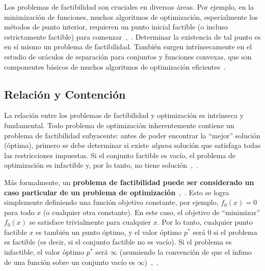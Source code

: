 Los problemas de factibilidad son cruciales en diversas áreas. Por ejemplo, en la minimización de funciones, muchos
algoritmos de optimización, especialmente los métodos de punto interior, requieren un punto inicial factible (o incluso
estrictamente factible) para comenzar~\cite[p.~579]{BoydVandenberghe2004},~\cite[p.~372]{BoydVandenbergheSlides2023}.
Determinar la existencia de tal punto es en sí mismo un problema de factibilidad. También surgen intrínsecamente en el
estudio de oráculos de separación para conjuntos y funciones convexas, que son componentes básicos de muchos algoritmos
de optimización eficientes~\cite[p.~1]{Sidford2020}.

\subsection{Relación y Contención}\label{sec:relation_containment}

La relación entre los problemas de factibilidad y optimización es intrínseca y fundamental. Todo problema de optimización
inherentemente contiene un problema de factibilidad subyacente: antes de poder encontrar la ``mejor'' solución (óptima),
primero se debe determinar si existe \textit{alguna} solución que satisfaga todas las restricciones impuestas. Si el
conjunto factible es vacío, el problema de optimización es infactible y, por lo tanto, no tiene solución~\cite[p.~128]{BoydVandenberghe2004},~\cite[p.~90]{BoydVandenbergheSlides2023}.

Más formalmente, un \textbf{problema de factibilidad puede ser considerado un caso particular de un problema de optimización}~\cite[p.~130]{BoydVandenberghe2004},~\cite[p.~94]{BoydVandenbergheSlides2023}. Esto se logra simplemente definiendo una
función objetivo constante, por ejemplo, $f_0(x) = 0$ para todo $x$ (o cualquier otra constante). En este caso, el objetivo
de ``minimizar'' $f_0(x)$ se satisface trivialmente para cualquier $x$. Por lo tanto, cualquier punto factible $x$ es también
un punto óptimo, y el valor óptimo $p^*$ será $0$ si el problema es factible (es decir, si el conjunto factible no es vacío).
Si el problema es infactible, el valor óptimo $p^*$ será $\infty$ (asumiendo la convención de que el ínfimo de una función
sobre un conjunto vacío es $\infty$)~\cite[p.~129]{BoydVandenberghe2004},~\cite[p.~94]{BoydVandenbergheSlides2023}.

